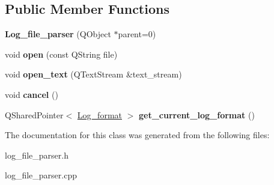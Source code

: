 \subsection*{Public Member Functions}
\begin{DoxyCompactItemize}
\item 
\hypertarget{class_log__viewer_1_1_log__file__parser_a308032ef6565bf34dac8c41f60704270}{{\bfseries Log\-\_\-file\-\_\-parser} (Q\-Object $\ast$parent=0)}\label{class_log__viewer_1_1_log__file__parser_a308032ef6565bf34dac8c41f60704270}

\item 
\hypertarget{class_log__viewer_1_1_log__file__parser_aa34205a80d670a8dbbec318da6b75a1a}{void {\bfseries open} (const Q\-String file)}\label{class_log__viewer_1_1_log__file__parser_aa34205a80d670a8dbbec318da6b75a1a}

\item 
\hypertarget{class_log__viewer_1_1_log__file__parser_a8ff908e5172c3d35830c3f333d928f39}{void {\bfseries open\-\_\-text} (Q\-Text\-Stream \&text\-\_\-stream)}\label{class_log__viewer_1_1_log__file__parser_a8ff908e5172c3d35830c3f333d928f39}

\item 
\hypertarget{class_log__viewer_1_1_log__file__parser_aec993a0ddf1d9d37e1398e68e1286b47}{void {\bfseries cancel} ()}\label{class_log__viewer_1_1_log__file__parser_aec993a0ddf1d9d37e1398e68e1286b47}

\item 
\hypertarget{class_log__viewer_1_1_log__file__parser_a72ed205ac6bda87dfe47c8b86bfca045}{Q\-Shared\-Pointer$<$ \hyperlink{class_log__viewer_1_1_log__format}{Log\-\_\-format} $>$ {\bfseries get\-\_\-current\-\_\-log\-\_\-format} ()}\label{class_log__viewer_1_1_log__file__parser_a72ed205ac6bda87dfe47c8b86bfca045}

\end{DoxyCompactItemize}


The documentation for this class was generated from the following files\-:\begin{DoxyCompactItemize}
\item 
log\-\_\-file\-\_\-parser.\-h\item 
log\-\_\-file\-\_\-parser.\-cpp\end{DoxyCompactItemize}
